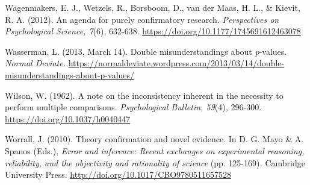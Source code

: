 \documentclass[authordate, meta, issue]{jote-new-article}
\begin{document}
	Wagenmakers, E. J., Wetzels, R., Borsboom, D., van der Maas, H. L., \& Kievit, R. A. (2012). An agenda for purely confirmatory research. \emph{Perspectives on Psychological Science, 7}(6), 632-638. \url{https://doi.org/10.1177/1745691612463078}



	Wasserman, L. (2013, March 14). Double misunderstandings about \emph{p}-values. \emph{Normal Deviate.} \url{https://normaldeviate.wordpress.com/2013/03/14/double-misunderstandings-about-p-values/}



	Wilson, W. (1962). A note on the inconsistency inherent in the necessity to perform multiple comparisons. \emph{Psychological Bulletin, 59}(4)\emph{,} 296-300. \url{https://doi.org/10.1037/h0040447}



	Worrall, J. (2010). Theory conﬁrmation and novel evidence. In D. G. Mayo \& A. Spanos (Eds.), \emph{Error and inference: Recent exchanges on experimental reasoning, reliability, and the objectivity and rationality of science }(pp. 125-169)\emph{.} Cambridge University Press. \url{http://doi.org/10.1017/CBO9780511657528}
\end{document}
